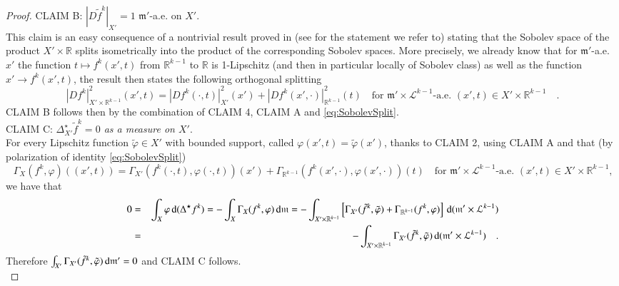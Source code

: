 \documentclass[11pt,reqno]{amsart}
\newcommand{\mm}{\mathfrak m}
\renewcommand{\d}{{\rm{d}}}
\newcommand{\R}{\mathbb{R}}
\theoremstyle{definition}
\theoremstyle{remark}
\theoremstyle{remark}
\theoremstyle{remark}
\theoremstyle{remark}
\theoremstyle{remark}
\theoremstyle{remark}
\theoremstyle{remark}
\begin{document}
\begin{proof}
CLAIM B: \emph{ $|D\tilde{f}^k|_{X'}=1$} $\mm'$-a.e. on $X'$.
\\This claim is an easy consequence of a nontrivial result proved in \cite{AGS11b} (see  \cite[Theorem 3.13]{GigliSplittingSur} for the statement we refer to) stating that the Sobolev space of the product $X'\times \R$  splits isometrically into  the product of the corresponding Sobolev spaces.  More precisely, we already know that for $\mm'$-a.e. $x'$ the  function $t\mapsto f^k(x',t)$ from $\R^{k-1}$ to $\R$ is 1-Lipschitz (and then in particular locally of Sobolev class) as well as the function $x'\to f^k(x',t)$, the result then states the following orthogonal splitting
\begin{equation}\label{eq:SobolevSplit}
|Df^k|^2_{X'\times \R^{k-1}} (x',t)=|D f^k(\cdot, t)|^2_{X'} (x')+ |D f^k(x',\cdot)|^2_{\R^{k-1}} (t)  \quad \text{for $\mm'\times {\mathcal L}^{k-1}$-a.e. $(x',t)\in X'\times \R^{k-1}$} \quad.
\end{equation}
CLAIM B follows then by the combination of  CLAIM 4, CLAIM A and \eqref{eq:SobolevSplit}.
\\

CLAIM C: \emph{$\Delta^\star_{X'} \tilde{f}^k =0$ as a measure on $X'$}.
\\For every Lipschitz function $\tilde{\varphi}\in X'$ with bounded support, called $\varphi(x',t)=\tilde{\varphi}(x')$, thanks to CLAIM 2, using CLAIM A and that  (by polarization of identity \eqref{eq:SobolevSplit})
$$\Gamma_X(f^k,\varphi)((x',t))=\Gamma_{X'} (f^k(\cdot,t), \varphi(\cdot,t))(x')+ \Gamma_{\R^{k-1}}(f^k(x',\cdot), \varphi(x',\cdot))(t) \quad \text{for $\mm'\times {\mathcal L}^{k-1}$-a.e. $(x',t)\in X'\times \R^{k-1}$,}$$
 we have that
\begin{eqnarray}
0&=&\int_X  \varphi \, \d(\Delta^\star f^k)=- \int_X \Gamma_X(f^k,\varphi)\, \d \mm = -\int_{X'\times \R^{k-1}} \left[ \Gamma_{X'}(\tilde{f}^k,\tilde{\varphi})+\Gamma_{\R^{k-1}}(f^k,\varphi) \right] \, \d (\mm'\times{\mathcal L}^{k-1}) \nonumber \\
&=&- \int_{X'\times \R^{k-1}} \Gamma_{X'}(\tilde{f}^k,\tilde{\varphi})  \, \d (\mm'\times{\mathcal L}^{k-1})\quad. \nonumber
\end{eqnarray}
Therefore  $ \int_{X'} \Gamma_{X'}(\tilde{f}^k,\tilde{\varphi})  \, \d \mm'=0 $ and CLAIM C follows.
\\


\end{proof}
\end{document}
